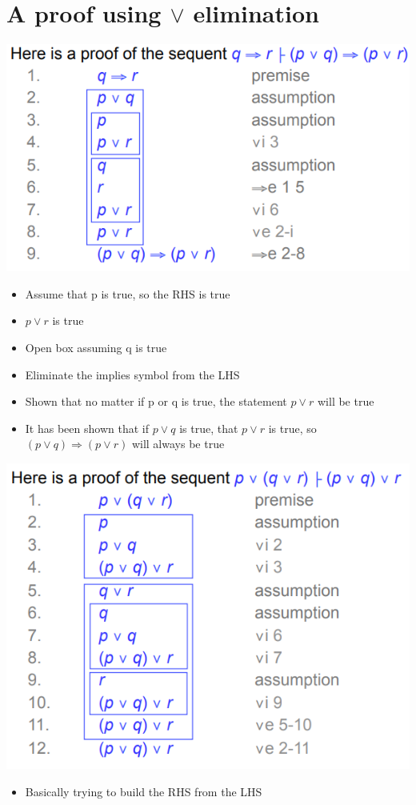 \documentclass{article}[18pt]
\begin{document}
\section{A proof using $\lor$ elimination}
\includegraphics[scale=0.7]{v_proof1.png}\\
\begin{itemize}
	\item Assume that p is true, so the RHS is true
	\item $p\lor r$ is true
	\item Open box assuming q is true
	\item Eliminate the implies symbol from the LHS
	\item Shown that no matter if p or q is true, the statement $p\lor r$ will be true
	\item It has been shown that if $p\lor q$ is true, that $p\lor r$ is true, so $(p\lor q)\Rightarrow (p\lor r)$ will always be true
\end{itemize}
\includegraphics[scale=0.7]{v_proof2.png}
\begin{itemize}
	\item Basically trying to build the RHS from the LHS
\end{itemize}
\end{document}
